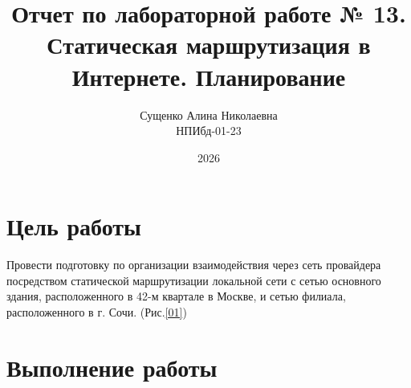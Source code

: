 

\title{Отчет по лабораторной работе № 13. \\ Статическая маршрутизация в Интернете. Планирование}
\author{Сущенко Алина Николаевна \\ НПИбд-01-23}
\date{2026}



\maketitle
\newpage

\tableofcontents

\newpage
\section{Цель работы}
Провести подготовку по организации взаимодействия через сеть провайдера посредством статической маршрутизации локальной сети с сетью основного здания, расположенного в 42-м квартале в Москве, и сетью филиала, расположенного в г. Сочи. (Рис.\ref{01}) 
\newpage

\section{Выполнение работы}
